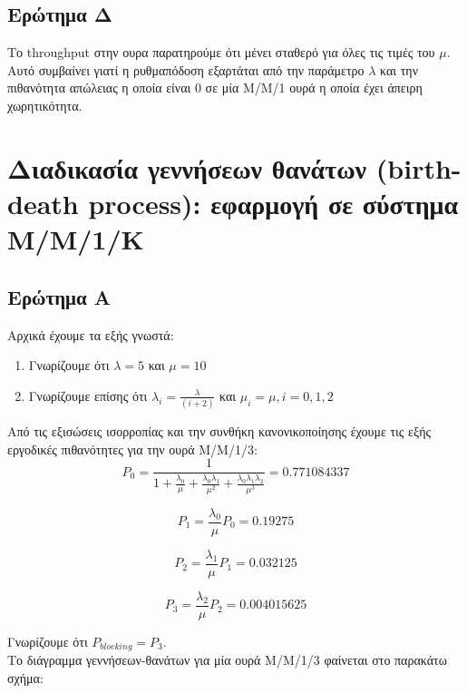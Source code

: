 \documentclass[12pt]{article}
\begin{document}
\subsection{Ερώτημα Δ}
Το throughput στην ουρα παρατηρούμε ότι μένει σταθερό για όλες τις τιμές του $\mu$.
Αυτό συμβαίνει γιατί η ρυθμαπόδοση εξαρτάται από την παράμετρο $\lambda$ και την 
πιθανότητα απώλειας η οποία είναι 0 σε μία Μ/Μ/1 ουρά η οποία έχει άπειρη χωρητικότητα.

\pagebreak

\section{Διαδικασία γεννήσεων θανάτων (birth-death process): εφαρμογή σε σύστημα
Μ/Μ/1/Κ}

\subsection{Ερώτημα Α}

Αρχικά έχουμε τα εξής γνωστά:
\begin{enumerate}
    \item{Γνωρίζουμε ότι $\lambda = 5$ και $\mu = 10$}
    \item{Γνωρίζουμε επίσης ότι $\lambda_i = \frac{\lambda}{(i+2)}$ και $\mu_i = \mu, i = 0,1,2$}
\end{enumerate}

Από τις εξισώσεις ισορροπίας και την συνθήκη κανονικοποίησης έχουμε τις
εξής εργοδικές πιθανότητες για την ουρά Μ/Μ/1/3: 
\begin{equation}
    P_0 = \frac{1}{1 + \frac{\lambda_0}{\mu} + \frac{\lambda_0\lambda_1}{\mu^2} + \frac{\lambda_0\lambda_1\lambda_2}{\mu^3}} = 0.771084337
\end{equation}

\begin{equation}
    P_1 = \frac{\lambda_0}{\mu}P_0 = 0.19275
\end{equation}

\begin{equation}
    P_2 = \frac{\lambda_1}{\mu}P_1 = 0.032125
\end{equation}

\begin{equation}
    P_3 = \frac{\lambda_2}{\mu}P_2 = 0.004015625
\end{equation}

Γνωρίζουμε ότι $P_{blocking} = P_3$.\\


Το διάγραμμα γεννήσεων-θανάτων για μία ουρά Μ/Μ/1/3 φαίνεται στο παρακάτω σχήμα:
\end{document}
